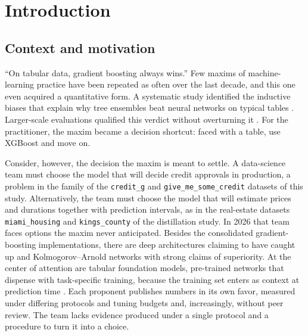 \chapter{Introduction}
\label{chap:intro}

\section{Context and motivation}
\label{sec:intro-contexto}

``On tabular data, gradient boosting always wins.'' Few maxims of
machine-learning practice have been repeated as often over the last
decade, and this one even acquired a quantitative form. A systematic
study identified the inductive biases that explain why tree ensembles
beat neural networks on typical tables \citep{grinsztajn2022}.
Larger-scale evaluations qualified this verdict without
overturning it \citep{mcelfresh2023}. For the practitioner, the maxim
became a decision shortcut: faced with a table, use XGBoost and move
on.

Consider, however, the decision the maxim is meant to settle. A
data-science team must choose the model that will decide credit
approvals in production, a problem in the family of the
\texttt{credit\_g} and
\texttt{give\_\allowbreak me\_\allowbreak some\_\allowbreak credit}
datasets of this study. Alternatively, the team must choose the model
that will estimate
prices and durations together with prediction
intervals, as in the real-estate datasets \texttt{miami\_housing} and
\texttt{kings\_county} of the distillation study. In 2026 that team
faces options the maxim never anticipated. Besides the
consolidated gradient-boosting implementations, there are deep
architectures claiming to have caught up and Kolmogorov--Arnold
networks with strong claims of superiority. At the center of
attention are tabular foundation models, pre-trained networks that
dispense with task-specific training, because the
training set enters as context at prediction time
\citep{hollmann2025,tabfm2026}. Each proponent publishes numbers in
its own favor, measured under differing protocols and tuning budgets
and, increasingly, without peer review. The team lacks evidence
produced under a single protocol and a procedure to turn it into a
choice.

